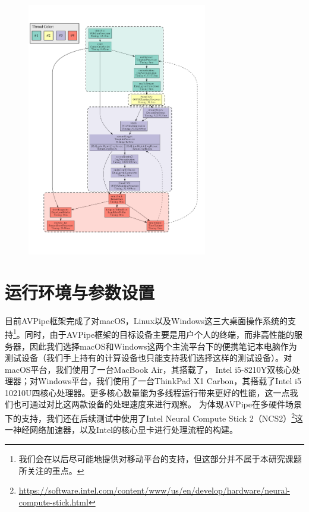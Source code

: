 \begin{figure}[!bt]
    \centering
    \includegraphics[width=0.7\textwidth]{figure/AVP_multi_hand_tracking.pdf}
    \label{fig:hand_dag}
\end{figure}

\section{运行环境与参数设置}
目前AVPipe框架完成了对macOS，Linux以及Windows这三大桌面操作系统的支持\footnote{我们会在以后尽可能地提供对移动平台的支持，但这部分并不属于本研究课题所关注的重点。}。同时，由于AVPipe框架的目标设备主要是用户个人的终端，而非高性能的服务器，因此我们选择macOS和Windows这两个主流平台下的便携笔记本电脑作为测试设备（我们手上持有的计算设备也只能支持我们选择这样的测试设备）。对macOS平台，我们使用了一台MacBook Air，其搭载了，
Intel i5-8210Y双核心处理器；对Windows平台，我们使用了一台ThinkPad X1 Carbon，其搭载了Intel i5 10210U四核心处理器。更多核心数量能为多线程运行带来更好的性能，这一点我们也可通过对比这两款设备的处理速度来进行观察。
为体现AVPipe在多硬件场景下的支持，我们还在后续测试中使用了Intel Neural Compute Stick 2（NCS2）\footnote{\url{https://software.intel.com/content/www/us/en/develop/hardware/neural-compute-stick.html}}这一神经网络加速器，以及Intel的核心显卡进行处理流程的构建。\par

